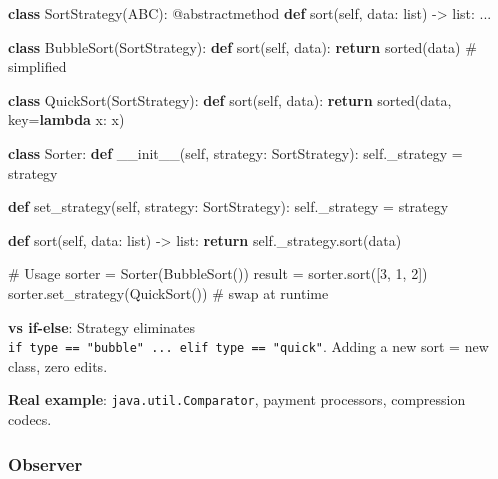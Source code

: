 \documentclass[11pt]{article}
\newenvironment{Shaded}{\begin{snugshade}}{\end{snugshade}}
\newcommand{\AttributeTok}[1]{\textcolor[rgb]{0.16,0.50,0.73}{#1}}
\newcommand{\BuiltInTok}[1]{\textcolor[rgb]{0.50,0.55,0.55}{#1}}
\newcommand{\CommentTok}[1]{\textcolor[rgb]{0.48,0.49,0.49}{#1}}
\newcommand{\ControlFlowTok}[1]{\textcolor[rgb]{0.99,0.74,0.29}{\textbf{#1}}}
\newcommand{\DecValTok}[1]{\textcolor[rgb]{0.96,0.45,0.00}{#1}}
\newcommand{\FunctionTok}[1]{\textcolor[rgb]{0.56,0.27,0.68}{#1}}
\newcommand{\KeywordTok}[1]{\textcolor[rgb]{0.81,0.81,0.76}{\textbf{#1}}}
\newcommand{\NormalTok}[1]{\textcolor[rgb]{0.81,0.81,0.76}{#1}}
\newcommand{\OperatorTok}[1]{\textcolor[rgb]{0.81,0.81,0.76}{#1}}
\newcommand{\VariableTok}[1]{\textcolor[rgb]{0.15,0.68,0.68}{#1}}
\begin{document}
\begin{Shaded}
\begin{Highlighting}[]
\KeywordTok{class}\NormalTok{ SortStrategy(ABC):}
    \AttributeTok{@abstractmethod}
    \KeywordTok{def}\NormalTok{ sort(}\VariableTok{self}\NormalTok{, data: }\BuiltInTok{list}\NormalTok{) }\OperatorTok{{-}\textgreater{}} \BuiltInTok{list}\NormalTok{: ...}

\KeywordTok{class}\NormalTok{ BubbleSort(SortStrategy):}
    \KeywordTok{def}\NormalTok{ sort(}\VariableTok{self}\NormalTok{, data): }\ControlFlowTok{return} \BuiltInTok{sorted}\NormalTok{(data)   }\CommentTok{\# simplified}

\KeywordTok{class}\NormalTok{ QuickSort(SortStrategy):}
    \KeywordTok{def}\NormalTok{ sort(}\VariableTok{self}\NormalTok{, data): }\ControlFlowTok{return} \BuiltInTok{sorted}\NormalTok{(data, key}\OperatorTok{=}\KeywordTok{lambda}\NormalTok{ x: x)}

\KeywordTok{class}\NormalTok{ Sorter:}
    \KeywordTok{def} \FunctionTok{\_\_init\_\_}\NormalTok{(}\VariableTok{self}\NormalTok{, strategy: SortStrategy):}
        \VariableTok{self}\NormalTok{.\_strategy }\OperatorTok{=}\NormalTok{ strategy}

    \KeywordTok{def}\NormalTok{ set\_strategy(}\VariableTok{self}\NormalTok{, strategy: SortStrategy):}
        \VariableTok{self}\NormalTok{.\_strategy }\OperatorTok{=}\NormalTok{ strategy}

    \KeywordTok{def}\NormalTok{ sort(}\VariableTok{self}\NormalTok{, data: }\BuiltInTok{list}\NormalTok{) }\OperatorTok{{-}\textgreater{}} \BuiltInTok{list}\NormalTok{:}
        \ControlFlowTok{return} \VariableTok{self}\NormalTok{.\_strategy.sort(data)}

\CommentTok{\# Usage}
\NormalTok{sorter }\OperatorTok{=}\NormalTok{ Sorter(BubbleSort())}
\NormalTok{result }\OperatorTok{=}\NormalTok{ sorter.sort([}\DecValTok{3}\NormalTok{, }\DecValTok{1}\NormalTok{, }\DecValTok{2}\NormalTok{])}
\NormalTok{sorter.set\_strategy(QuickSort())  }\CommentTok{\# swap at runtime}
\end{Highlighting}
\end{Shaded}

\textbf{vs if-else}: Strategy eliminates \texttt{if\ type\ ==\ "bubble"\ ...\ elif\ type\ ==\ "quick"}. Adding a new sort = new class, zero edits.

\textbf{Real example}: \texttt{java.util.Comparator}, payment processors, compression codecs.

\subsubsection{Observer}\label{observer}
\end{document}
